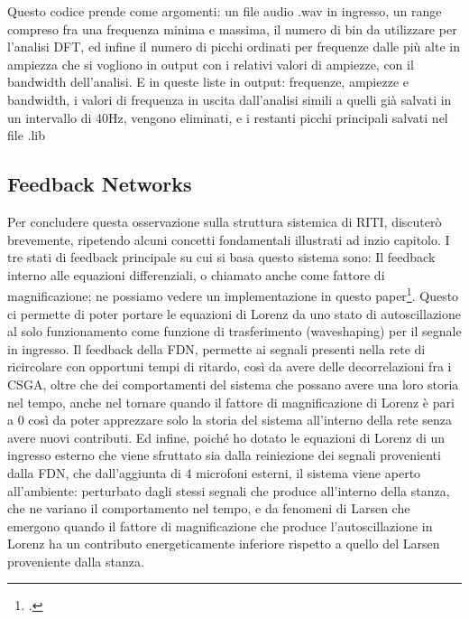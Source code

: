 Questo codice prende come argomenti:
un file audio .wav in ingresso, 
un range compreso fra una frequenza minima e massima, 
il numero di bin da utilizzare per l'analisi DFT,
ed infine il numero di picchi ordinati per frequenze dalle più alte in ampiezza
che si vogliono in output con i relativi valori di ampiezze, 
con il bandwidth dell'analisi.
E in queste liste in output: frequenze, ampiezze e bandwidth,
i valori di frequenza in uscita dall'analisi simili a quelli già salvati 
in un intervallo di 40Hz, vengono eliminati, 
e i restanti picchi principali salvati nel file .lib

\subsection{Feedback Networks}
\label{Feedback Networks}

Per concludere questa osservazione sulla struttura sistemica di RITI,
discuterò brevemente, ripetendo alcuni concetti fondamentali illustrati ad inzio capitolo.
I tre stati di feedback principale su cui si basa questo sistema sono:
Il feedback interno alle equazioni differenziali, o chiamato anche come fattore di magnificazione; 
ne possiamo vedere un implementazione in questo paper\footcite{liang_difference_2013}.
Questo ci permette di poter portare le equazioni di Lorenz da uno stato di autoscillazione al
solo funzionamento come funzione di trasferimento (waveshaping) per il segnale in ingresso.
Il feedback della FDN, permette ai segnali presenti nella rete di ricircolare
con opportuni tempi di ritardo, così da avere delle decorrelazioni fra i CSGA, oltre che dei comportamenti del sistema
che possano avere una loro storia nel tempo, anche nel tornare quando il fattore di magnificazione di Lorenz è pari a 0
così da poter apprezzare solo la storia del sistema all'interno della rete senza avere nuovi contributi.
Ed infine, poiché ho dotato le equazioni di Lorenz di un ingresso esterno che viene sfruttato
sia dalla reiniezione dei segnali provenienti dalla FDN, che dall'aggiunta di 4 microfoni esterni,
il sistema viene aperto all'ambiente: perturbato dagli stessi segnali che produce all'interno della stanza,
che ne variano il comportamento nel tempo, e da fenomeni di Larsen che emergono quando il fattore di 
magnificazione che produce l'autoscillazione in Lorenz ha un contributo energeticamente 
inferiore rispetto a quello del Larsen proveniente dalla stanza.
\clearpage

